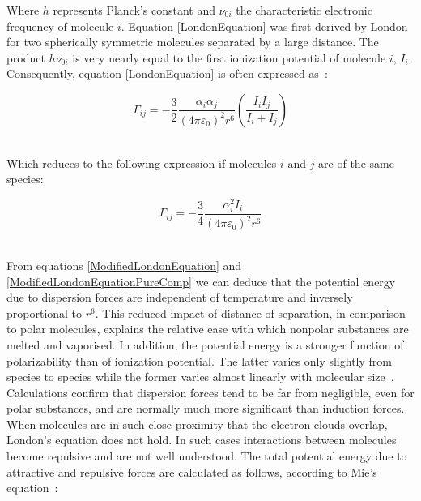 
Where $h$ represents Planck's constant and $\nu_{0i}$ the characteristic electronic frequency of molecule $i$. Equation \ref{LondonEquation} was first derived by London for two spherically symmetric molecules separated by a large distance. The product $h\nu_{0i}$ is very nearly equal to the first ionization potential of molecule $i$, $I_{i}$. Consequently, equation \ref{LondonEquation} is often expressed as~\cite{MolecularThermodynamicsOfFluidPhaseEquilibria}:\

\begin{equation}
\Gamma_{ij} = -\frac{3}{2}\frac{\alpha_{i}\alpha_{j}}{\left(4\pi\varepsilon_{0}\right)^{2}r^{6}}\left(\frac{I_{i}I_{j}}{I_{i}+I_{j}}\right) \label{ModifiedLondonEquation}
\end{equation}\

Which reduces to the following expression if molecules $i$ and $j$ are of the same species:\

\begin{equation}
\Gamma_{ij} = -\frac{3}{4}\frac{\alpha_{i}^{2}I_{i}}{\left(4\pi\varepsilon_{0}\right)^{2}r^{6}} \label{ModifiedLondonEquationPureComp}
\end{equation}\

From equations \ref{ModifiedLondonEquation} and \ref{ModifiedLondonEquationPureComp} we can deduce that the potential energy due to dispersion forces are independent of temperature and inversely proportional to $r^{6}$. This reduced impact of distance of separation, in comparison to polar molecules, explains the relative ease with which nonpolar substances are melted and vaporised. In addition, the potential energy is a stronger function of polarizability than of ionization potential. The latter varies only slightly from species to species while the former varies almost linearly with molecular size~\cite{MolecularThermodynamicsOfFluidPhaseEquilibria}.\\

Calculations confirm that dispersion forces tend to be far from negligible, even for polar substances, and are normally much more significant than induction forces. When molecules are in such close proximity that the electron clouds overlap, London's equation does not hold. In such cases interactions between molecules become repulsive and are not well understood. The total potential energy due to attractive and repulsive forces are calculated as follows, according to Mie's equation~\cite{MolecularThermodynamicsOfFluidPhaseEquilibria}:\

